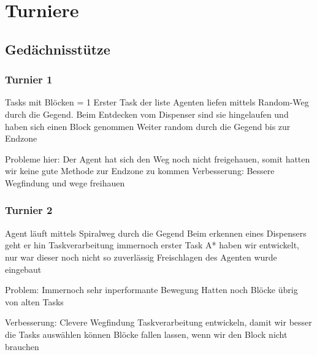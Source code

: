 \chapter{Turniere}

\section{Gedächnisstütze}
\subsection{Turnier 1}
Tasks mit Blöcken = 1 \newline
Erster Task der liste \newline
Agenten liefen mittels Random-Weg durch die Gegend. \newline
Beim Entdecken vom Dispenser sind sie hingelaufen und haben sich einen Block genommen \newline
Weiter random durch die Gegend bis zur Endzone \newline

Probleme hier: Der Agent hat sich den Weg noch nicht freigehauen, somit hatten wir keine gute Methode zur Endzone zu kommen \newline
Verbesserung: Bessere Wegfindung und wege freihauen

\subsection{Turnier 2}
Agent läuft mittels Spiralweg durch die Gegend \newline
Beim erkennen eines Dispensers geht er hin \newline
Taskverarbeitung immernoch erster Task \newline
A* haben wir entwickelt, nur war dieser noch nicht so zuverlässig \newline
Freischlagen des Agenten wurde eingebaut

Problem: Immernoch sehr inperformante Bewegung \newline
Hatten noch Blöcke übrig von alten Tasks \newline

Verbesserung: Clevere Wegfindung \newline
Taskverarbeitung entwickeln, damit wir besser die Tasks auswählen können \newline
Blöcke fallen lassen, wenn wir den Block nicht brauchen \newline

